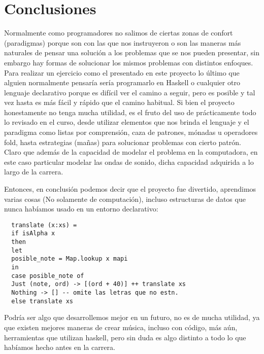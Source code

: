 \documentclass[10pt,a4paper]{article}
\begin{document}
\section{Conclusiones}
\noindent Normalmente como programadores no salimos de ciertas zonas de confort
(paradigmas) porque son con las que nos instruyeron o son las maneras más
naturales de pensar una solución a los problemas que se nos pueden presentar, sin
embargo hay formas de solucionar los mismos problemas con distintos enfoques.
Para realizar un ejercicio como el presentado en este proyecto lo último que
alguien normalmente pensaría sería programarlo en Haskell o cualquier otro
lenguaje declarativo porque es difícil ver el camino a seguir, pero es posible y
tal vez hasta es más fácil y rápido que el camino habitual. Si bien el proyecto
honestamente no tenga mucha utilidad, es el fruto del uso de prácticamente todo
lo revisado en el curso, desde utilizar elementos que nos brinda el lenguaje y el
paradigma como listas por comprensión, caza de patrones, mónadas u operadores
fold, hasta estrategias (mañas) para solucionar problemas con cierto patrón.
Claro que además de la capacidad de modelar el problema en la computadora, en
este caso particular modelar las ondas de sonido, dicha capacidad adquirida a lo
largo de la carrera.

Entonces, en conclusión podemos decir que el proyecto fue divertido, aprendimos
varias cosas (No solamente de computación), incluso estructuras de datos que
nunca habíamos usado en un entorno declarativo:

\begin{verbatim}
  translate (x:xs) =
  if isAlpha x
  then
  let
  posible_note = Map.lookup x mapi
  in
  case posible_note of
  Just (note, ord) -> [(ord + 40)] ++ translate xs
  Nothing -> [] -- omite las letras que no estn.
  else translate xs
\end{verbatim}

Podría ser algo que desarrollemos mejor en un futuro, no es de mucha utilidad,
ya que existen mejores maneras de crear música, incluso con código, más aún,
herramientas que utilizan haskell\cite{tidal}, pero sin duda es algo distinto a
todo lo que habíamos hecho antes en la carrera.

 {
  \nocite{paul}
  \nocite{tidal}
  \nocite{u2}
  \nocite{otro}
}

\end{document}
